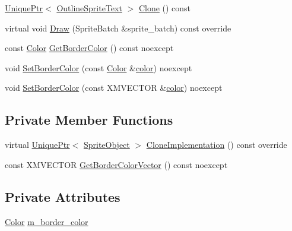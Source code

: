 \begin{DoxyCompactItemize}
\item 
\hyperlink{namespacemage_a8c307fbcc33bce9b7f2aa4c26c3b95cf}{Unique\+Ptr}$<$ \hyperlink{classmage_1_1_outline_sprite_text}{Outline\+Sprite\+Text} $>$ \hyperlink{classmage_1_1_outline_sprite_text_aa188cb104f6f00fdc75c532d66869f02}{Clone} () const
\item 
virtual void \hyperlink{classmage_1_1_outline_sprite_text_a524e9ad1caeeeaa32405e61d1a5e1032}{Draw} (Sprite\+Batch \&sprite\+\_\+batch) const override
\item 
const \hyperlink{structmage_1_1_color}{Color} \hyperlink{classmage_1_1_outline_sprite_text_adb4936119bcc0b148c9e11f021e83940}{Get\+Border\+Color} () const noexcept
\item 
void \hyperlink{classmage_1_1_outline_sprite_text_a66b448443de5a459bb28f66c682a12bd}{Set\+Border\+Color} (const \hyperlink{structmage_1_1_color}{Color} \&\hyperlink{namespacemage_a8ac46837ac2f6a9b756e66979165acd6}{color}) noexcept
\item 
void \hyperlink{classmage_1_1_outline_sprite_text_acb4952d08d69ee8ccd20fb668f3efcd3}{Set\+Border\+Color} (const X\+M\+V\+E\+C\+T\+OR \&\hyperlink{namespacemage_a8ac46837ac2f6a9b756e66979165acd6}{color}) noexcept
\end{DoxyCompactItemize}
\subsection*{Private Member Functions}
\begin{DoxyCompactItemize}
\item 
virtual \hyperlink{namespacemage_a8c307fbcc33bce9b7f2aa4c26c3b95cf}{Unique\+Ptr}$<$ \hyperlink{classmage_1_1_sprite_object}{Sprite\+Object} $>$ \hyperlink{classmage_1_1_outline_sprite_text_af8d29408abb61c05a23499bf37c4c7b0}{Clone\+Implementation} () const override
\item 
const X\+M\+V\+E\+C\+T\+OR \hyperlink{classmage_1_1_outline_sprite_text_a287bef30662bbd00ca999b3577249226}{Get\+Border\+Color\+Vector} () const noexcept
\end{DoxyCompactItemize}
\subsection*{Private Attributes}
\begin{DoxyCompactItemize}
\item 
\hyperlink{structmage_1_1_color}{Color} \hyperlink{classmage_1_1_outline_sprite_text_a19301d370498a08759445f415da78822}{m\+\_\+border\+\_\+color}
\end{DoxyCompactItemize}

